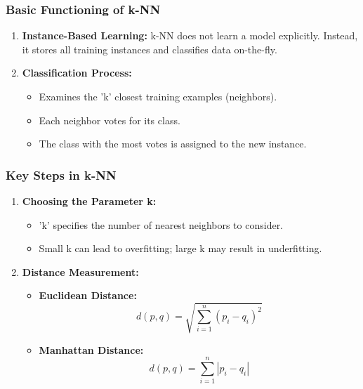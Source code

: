 \documentclass[aspectratio=169]{beamer}
\begin{document}
\begin{frame}[fragile]
    \frametitle{Basic Functioning of k-NN}
    \begin{enumerate}
        \item \textbf{Instance-Based Learning:} k-NN does not learn a model explicitly. Instead, it stores all training instances and classifies data on-the-fly.
        \item \textbf{Classification Process:}
            \begin{itemize}
                \item Examines the 'k' closest training examples (neighbors).
                \item Each neighbor votes for its class.
                \item The class with the most votes is assigned to the new instance.
            \end{itemize}
    \end{enumerate}
\end{frame}

\begin{frame}[fragile]
    \frametitle{Key Steps in k-NN}
    \begin{enumerate}
        \item \textbf{Choosing the Parameter k:}
            \begin{itemize}
                \item 'k' specifies the number of nearest neighbors to consider.
                \item Small k can lead to overfitting; large k may result in underfitting.
            \end{itemize}
        \item \textbf{Distance Measurement:}
            \begin{itemize}
                \item \textbf{Euclidean Distance:}
                    \begin{equation}
                        d(p, q) = \sqrt{\sum_{i=1}^{n} (p_i - q_i)^2}
                    \end{equation}
                \item \textbf{Manhattan Distance:}
                    \begin{equation}
                        d(p, q) = \sum_{i=1}^{n} |p_i - q_i|
                    \end{equation}
            \end{itemize}
    \end{enumerate}
\end{frame}
\end{document}

